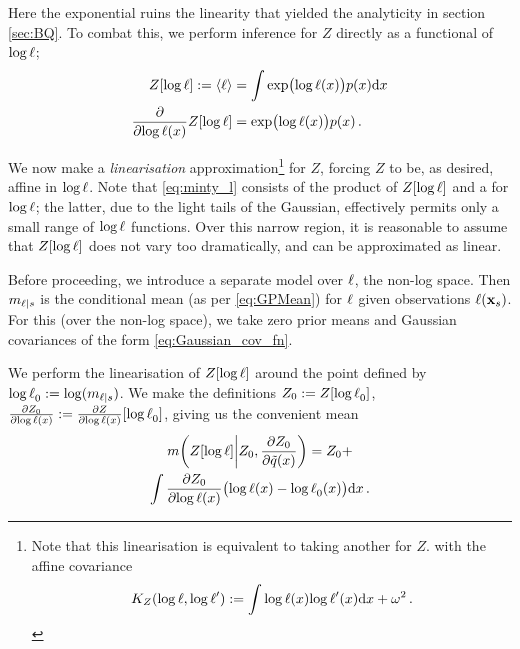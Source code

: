 \documentclass{article}
\begin{document}
Here the exponential ruins the linearity that yielded the analyticity in section \ref{sec:BQ}. To combat this, we perform inference for $Z$ directly as a functional of $\tr$;
%
\begin{align*}
 Z[\tr] \deq \inty{\lfn} & = \int \exp \bigl( \tr(\lfv)\bigr) p(\lfv) \ud \lfv\\
\pderiv{}{\tr(\lfv)}Z[\tr] & = \exp \bigl( \tr(\lfv)\bigr) p(\lfv) %
\,.
\end{align*}

We now make a \emph{linearisation} approximation\footnote{Note that this linearisation is equivalent to taking another \gpb for $Z$. with the affine covariance
\begin{equation*}
 K_Z(\tr,\tr')
\deq
\int\tr(\lfv) \tr'(\lfv) \ud \lfv
+ \omega^2\,.
\end{equation*}
} 
for $Z$, forcing $Z$ to be, as desired, affine in $\tr$. 
Note that \eqref{eq:minty_l} consists of the product of $Z[\tr]$ and a \gpb for $\tr$; the latter, due to the light tails of the Gaussian, effectively permits only a small range of $\tr$ functions. Over this narrow region, it is reasonable to assume that $Z[\tr]$ does not vary too dramatically, and can be approximated as linear. 

Before proceeding, we introduce a separate \gpb model over $\lfn$, the non-log space.  Then $m_{\lfn|s}$ is the \gpb conditional mean (as per \eqref{eq:GPMean}) for $\lfn$ given observations $\lfn(\vlfv_s)$. For this \gpb (over the non-log space), we take zero prior means and Gaussian
covariances of the form \eqref{eq:Gaussian_cov_fn}. 

We perform the linearisation of $Z[\tr]$ around the point defined by $\tr_0 \deq \log (m_{\lfn|s})$. We make the definitions 
$Z_0 \deq Z[\tr_0]$, $\pderiv{Z_0}{\tr(\lfv)} \deq \pderiv{Z}{\tr(\lfv)}[\tr_0]$, giving us the convenient mean
\begin{multline}\label{eq:linearisation}
\novmean{Z[\tr]}{Z_0,\pderiv{Z_0}{\tq(\lfv)}} 
= Z_0+\\
\int \pderiv{Z_0}{\tr(\lfv)}\bigl(\tr(\lfv)-\tr_0(\lfv)\bigr)\ud\lfv\,.
\end{multline}
\end{document}
